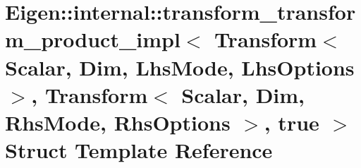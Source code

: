 \hypertarget{struct_eigen_1_1internal_1_1transform__transform__product__impl_3_01_transform_3_01_scalar_00_01d4d27ccbe125554f45d57d9ccad049c2}{}\section{Eigen\+:\+:internal\+:\+:transform\+\_\+transform\+\_\+product\+\_\+impl$<$ Transform$<$ Scalar, Dim, Lhs\+Mode, Lhs\+Options $>$, Transform$<$ Scalar, Dim, Rhs\+Mode, Rhs\+Options $>$, true $>$ Struct Template Reference}
\label{struct_eigen_1_1internal_1_1transform__transform__product__impl_3_01_transform_3_01_scalar_00_01d4d27ccbe125554f45d57d9ccad049c2}
